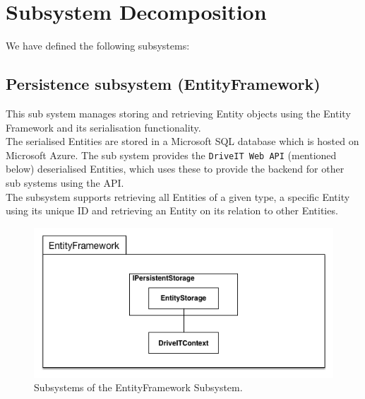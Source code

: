 \section{Subsystem Decomposition}
We have defined the following subsystems:
\subsection{Persistence subsystem (EntityFramework)} 
This sub system manages storing and retrieving Entity objects using the Entity Framework and its serialisation functionality.\\
The serialised Entities are stored in a Microsoft SQL database which is hosted on Microsoft Azure. The sub system provides the \texttt{DriveIT Web API} (mentioned below) deserialised Entities, which uses these to provide the backend for other sub systems using the API.\\
The subsystem supports retrieving all Entities of a given type, a specific Entity using its unique ID and retrieving an Entity on its relation to other Entities. 
\begin{figure}[H]
	\centering
	\includegraphics[scale=0.70]{Figures/EntityFrameworkSubsystemDecomposition}
	\caption{Subsystems of the EntityFramework Subsystem.}
\end{figure}

